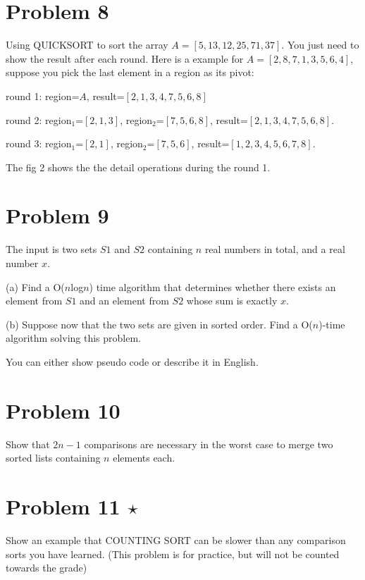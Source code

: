 \documentclass{article}
\begin{document}
\section*{Problem 8}
Using QUICKSORT to sort the array $A=[5, 13, 12, 25, 71, 37]$. You just need to show the result after each round. Here is a example for $A=[2, 8, 7, 1, 3, 5, 6, 4]$, suppose you pick the last element in a region as its pivot:

round 1: region=$A$, result=$[2, 1, 3, 4, 7, 5, 6, 8]$

round 2: region$_1$=$[2, 1, 3]$, region$_2$=$[7, 5, 6, 8]$, result=$[2, 1, 3, 4, 7, 5, 6, 8]$. 

round 3: region$_1$=$[2,1]$, region$_2$=$[7, 5, 6]$, result=$[1, 2, 3, 4, 5, 6, 7, 8]$.

The fig 2 shows the the detail operations during the round 1.

%

\section*{Problem 9}
The input is two sets $S1$ and $S2$ containing $n$ real numbers in total, and a real number $x$.

(a) Find a O($n$log$n$) time algorithm that determines whether there exists an element from $S1$ and an element from $S2$ whose sum is exactly $x$.

(b) Suppose now that the two sets are given in sorted order. Find a O($n$)-time algorithm solving this problem.

You can either show pseudo code or describe it in English.

\section*{Problem 10}
Show that $2n-1$ comparisons are necessary in the worst case to merge
two sorted lists containing $n$ elements each.


%

\section*{Problem 11 $\star$}
Show an example that COUNTING SORT can be slower than any comparison sorts you have learned. (This problem is for practice,  but will not be counted towards the grade)
\end{document}
